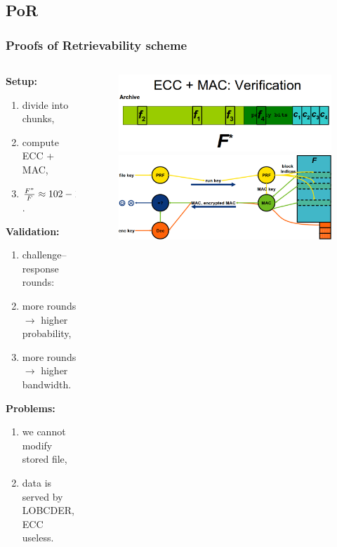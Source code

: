 \documentclass[compress]{beamer}
\begin{document}
\subsection{PoR}
\begin{frame}
\frametitle{\textbf{Proofs of Retrievability scheme}}
\begin{columns}
	\begin{column}{0.5\textwidth}
		\small
		\textbf{Setup:}
		\begin{enumerate}
			\item divide into chunks,
			\item compute ECC + MAC,
			\item ${F^{*} \over F} \approx 102-115\%$.
		\end{enumerate}
		\textbf{Validation:}
		\begin{enumerate}
			\item challenge--response rounds:
			\item more rounds $\rightarrow$ higher probability,
			\item more rounds $\rightarrow$ higher bandwidth.
		\end{enumerate}
		\textbf{Problems:}
		\begin{enumerate}
			\item we cannot modify stored file,
			\item data is served by LOBCDER, ECC useless.
		\end{enumerate}
	\end{column}
	\begin{column}{0.5\textwidth}
		\begin{figure}
			\centering
			\includegraphics[width=\textwidth]{img/modified_file.png}\\
			\vspace{1cm}
			\includegraphics[width=\textwidth]{img/por-diagram.png}
		\end{figure}
	\end{column}
\end{columns}
\end{frame}
\end{document}
